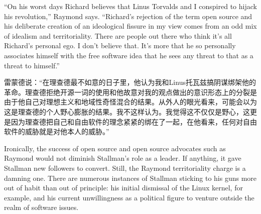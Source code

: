 \ifdefined\eng
``On his worst days Richard believes that Linus Torvalds and I conspired to hijack his revolution,'' Raymond says. ``Richard's rejection of the term open source and his deliberate creation of an ideological fissure in my view comes from an odd mix of idealism and territoriality. There are people out there who think it's all Richard's personal ego. I don't believe that. It's more that he so personally associates himself with the free software idea that he sees any threat to that as a threat to himself.''
\fi

\ifdefined\chs
雷蒙德说：``在理查德最不如意的日子里，他认为我和Linus托瓦兹搞阴谋绑架他的革命。理查德拒绝开源一词的使用和他故意对我的观点做出的意识形态上的分裂是由于他自己对理想主义和地域性奇怪混合的结果。从外人的眼光看来，可能会以为这是理查德的个人野心膨胀的结果。我不这样认为。我觉得这不仅仅是野心，这更是因为理查德把自己和自由软件的理念紧紧的绑在了一起，在他看来，任何对自由软件的威胁就是对他本人的威胁。''
\fi



\ifdefined\eng
Ironically, the success of open source and open source advocates such as Raymond would not diminish Stallman's role as a leader. If anything, it gave Stallman new followers to convert. Still, the Raymond territoriality charge is a damning one. There are numerous instances of Stallman sticking to his guns more out of habit than out of principle: his initial dismissal of the Linux kernel, for example, and his current unwillingness as a political figure to venture outside the realm of software issues.
\fi

